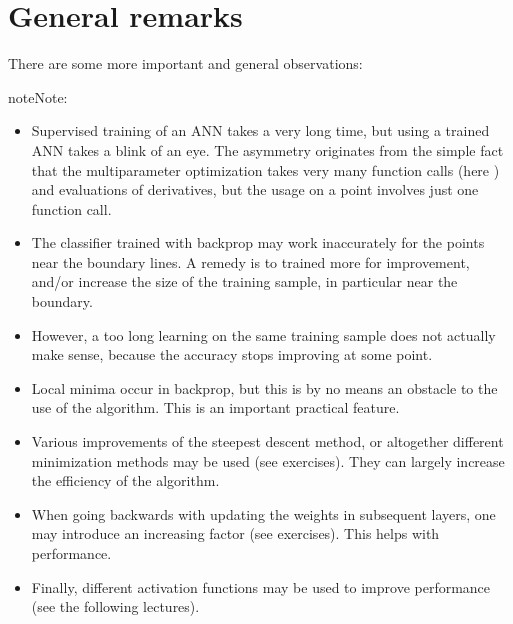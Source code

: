 \documentclass[letterpaper,10pt,english]{jupyterBook}
\begin{document}
\noindent{}


\section{General remarks}
\label{\detokenize{docs/backprop:general-remarks}}
\sphinxAtStartPar
There are some more important and general observations:

\begin{sphinxadmonition}{note}{Note:}\begin{itemize}
\item {} 
\sphinxAtStartPar
Supervised training of an ANN takes a very long time, but using a trained ANN takes a blink of an eye. The asymmetry originates from the simple fact that the multi\sphinxhyphen{}parameter optimization takes very many function calls (here ) and evaluations of derivatives, but the usage on a point involves just one function call.

\item {} 
\sphinxAtStartPar
The classifier trained with backprop may work inaccurately for the points near the boundary lines. A remedy is to trained more for improvement, and/or increase the
size of the training sample, in particular near the boundary.

\item {} 
\sphinxAtStartPar
However, a too long learning on the same training sample does not actually make sense, because the accuracy stops improving at some point.

\item {} 
\sphinxAtStartPar
Local minima occur in backprop, but this is by no means an obstacle to the use of the algorithm. This is an important practical feature.

\item {} 
\sphinxAtStartPar
Various improvements of the steepest descent method, or altogether different minimization methods may be used (see exercises). They can largely increase the efficiency of the algorithm.

\item {} 
\sphinxAtStartPar
When going backwards with updating the weights in subsequent layers, one may introduce an increasing factor (see exercises). This helps with performance.

\item {} 
\sphinxAtStartPar
Finally, different activation functions may be used to improve performance (see the following lectures).

\end{itemize}
\end{sphinxadmonition}
\end{document}
